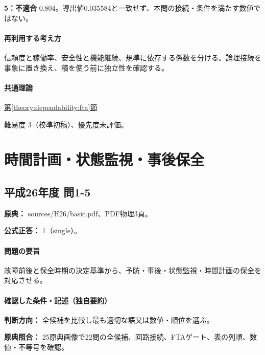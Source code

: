 \noindent\textbf{5：不適合} 0.804。導出値0.035584と一致せず、本問の接続・条件を満たす数値ではない。\par

\paragraph{再利用する考え方} 信頼度と稼働率、安全性と機能継続、規準に依存する係数を分ける。論理接続を事象に置き換え、積を使う前に独立性を確認する。

\paragraph{共通理論} \hyperref[theory:dependability:fta]{第\ref*{theory:dependability:fta}節}

\par 難易度 3（校準初稿）、優先度未評価。

\section{時間計画・状態監視・事後保全}

\subsection{平成26年度 問1-5}
\label{q:h26-reg-basic-1-5}

\noindent\textbf{原典：} sources/H26/basic.pdf、PDF物理3頁。

\textbf{公式正答：} 1（single）。

\paragraph{問題の要旨} 故障前後と保全時期の決定基準から、予防・事後・状態監視・時間計画の保全を対応させる。

\paragraph{確認した条件・記述（独自要約）}\mbox{}\par

\noindent\textbf{判断方向：} 全候補を比較し最も適切な語又は数値・順位を選ぶ。\par

\noindent\textbf{原典照合：} 25原典画像で22問の全候補、回路接続、FTAゲート、表の列順、数値・不等号を確認。\par


